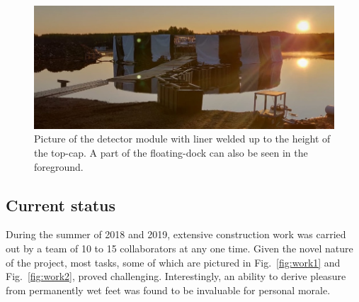 \begin{figure} %
    \includegraphics[width=\textwidth]{diagrams/4-chips/chips_with_liner_sun.jpeg}
    \caption[Picture of the \chipsfive detector module with liner]
    {Picture of the \chipsfive detector module with liner welded up to the height of the top-cap.
        A part of the floating-dock can also be seen in the foreground.}
    \label{fig:chips_with_liner}
\end{figure}

\subsection{Current status} %
\label{sec:chips_detector_status} %

During the summer of 2018 and 2019, extensive \chipsfive construction work was carried out by a
team of 10 to 15 collaborators at any one time. Given the novel nature of the project, most tasks,
some of which are pictured in Fig.~\ref{fig:work1} and Fig.~\ref{fig:work2}, proved challenging.
Interestingly, an ability to derive pleasure from permanently wet feet was found to be invaluable
for personal morale.


